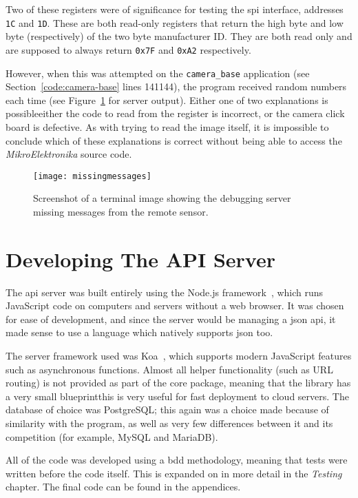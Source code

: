 Two of these registers were of significance for testing the \acrshort{spi}
interface, addresses \texttt{1C} and \texttt{1D}. These are both read-only
registers that return the high byte and low byte (respectively) of the two
byte manufacturer ID. They are both read only and are supposed to always
return \texttt{0x7F} and \texttt{0xA2} respectively.

However, when this was attempted on the \texttt{camera\_base} application
(see Section~\ref{code:camera-base} lines 141\textendash{}144), the program
received random numbers each time (see Figure~\ref{fig:missingmessages} for
server output). Either one of two explanations is possible\textemdash{}either
the code to read from the register is incorrect, or the camera click board is
defective. As with trying to read the image itself, it is impossible to
conclude which of these explanations is correct without being able to access
the \textit{MikroElektronika} source code.

\begin{figure}[h]
  \centering
  \texttt{[image: missingmessages]}
  \caption{Screenshot of a terminal image showing the debugging server
  missing messages from the remote sensor.}
  \label{fig:missingmessages}
\end{figure}

\section{Developing The API Server}
The \acrshort{api} server was built entirely using the Node.js
framework~\cite{nodejs}, which runs JavaScript code on computers and servers
without a web browser. It was chosen for ease of development, and since the
server would be managing a \acrshort{json} \acrshort{api}, it made sense to
use a language which natively supports \acrshort{json} too.

The server framework used was Koa~\cite{koa}, which supports modern
JavaScript features such as asynchronous functions. Almost all helper
functionality (such as URL routing) is not provided as part of the core
package, meaning that the library has a very small blueprint\textemdash{}this
is very useful for fast deployment to cloud servers. The database of choice
was PostgreSQL; this again was a choice made because of similarity with the
program, as well as very few differences between it and its competition (for
example, MySQL and MariaDB).

All of the code was developed using a \acrfull{bdd} methodology, meaning that
tests were written before the code itself. This is expanded on in more detail
in the \textit{Testing} chapter. The final code can be found in the appendices.